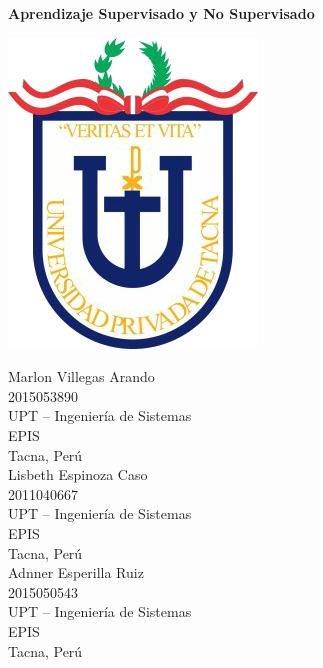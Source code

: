\documentclass[11pt,a4paper]{article}
\begin{document}
		
		\begin{center}
			\huge \textbf{Aprendizaje Supervisado y No Supervisado} 
		\end{center}
		
		\begin{center}
			\includegraphics[scale=0.50]{./Imagenes/logo}
		\end{center}
		
		\begin{multicols}{2}
			\small
			\begin{center}
				Marlon Villegas Arando\\
				2015053890\\
				UPT – Ingeniería de Sistemas\\
				EPIS\\
				Tacna, Perú\\
				
				\vspace{\baselineskip}
				Lisbeth Espinoza Caso\\
				2011040667\\
				UPT – Ingeniería de Sistemas\\  
				EPIS\\	
				Tacna, Perú\\ 
  
                                \vspace{\baselineskip}
				Adnner Esperilla Ruiz\\
				2015050543\\
				UPT – Ingeniería de Sistemas\\  
				EPIS\\	
				Tacna, Perú\\               

			\end{center}
			\normalsize			
		\end{multicols}
		\vspace{\baselineskip}
\end{document}
